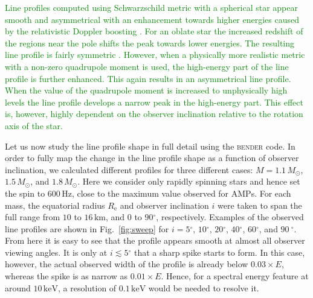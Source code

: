 \documentclass{aa}
\newcommand{\refe}[1]{\textcolor{green}{{#1}}}
\newcommand{\refedel}[1]{}
\newcommand{\sch}{Schwarzschild }
\newcommand{\Msun}{\ensuremath{M_{\odot}}}
\renewcommand{\deg}{\ensuremath{^{\circ}}}
\begin{document}
\refe{Line profiles computed using \sch metric with a spherical star appear smooth and asymmetrical with an enhancement towards higher energies caused by the relativistic Doppler boosting \citep[see e.g.][]{OP03}.}
\refe{For an oblate star the increased redshift of the regions near the pole shifts the peak towards lower energies.}
\refe{The resulting line profile is fairly symmetric \citep[see e.g.][]{BPO13}.}
\refe{However, when a physically more realistic metric with a non-zero quadrupole moment is used, the high-energy part of the line profile is further enhanced.}
\refe{This again results in an asymmetrical line profile.}
\refe{When the value of the quadrupole moment is increased to unphysically high levels the line profile develops a narrow peak in the high-energy part.}
\refe{This effect is, however, highly dependent on the observer inclination relative to the rotation axis of the star.}


Let us now study the line profile shape in full detail using the \textsc{bender} code.
In order to fully map the change in the line profile shape as a function of observer inclination, we calculated different profiles for three different cases: $M=1.1\,\Msun$, $1.5\,\Msun$, and $1.8\,\Msun$.
Here we consider only rapidly spinning stars and hence set the spin to $600\,\mathrm{Hz}$, close to the maximum value observed for AMPs.
For each mass, the equatorial radius $R_{\mathrm{e}}$ and observer inclination $i$ were taken to span the full range from $10$ to $16\,\mathrm{km}$, and $0$ to $90\deg$, respectively.
Examples of the observed line profiles are shown in Fig.~\ref{fig:sweep} for $i=5\deg$, $10\deg$, $20\deg$, $40\deg$, $60\deg$, and $90~\deg$.
From here it is easy to see that the profile appears smooth at almost all observer viewing angles.
It is only at $i \lesssim 5\deg$ that a sharp spike starts to form.
In this case, however, the actual observed width of the profile is already below $0.03 \times E$, whereas the spike is as narrow as $0.01 \times E$.
Hence, for a spectral energy feature at around $10\,\mathrm{keV}$, a resolution of $0.1\,\mathrm{keV}$ would be needed to resolve it.
\refedel{At the moment, there are no existing observational facilities with sufficient resolution to separate the compact spike from the rest of the line profile.}
\end{document}
